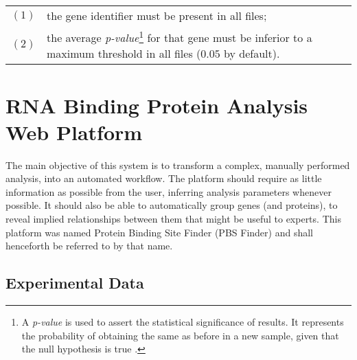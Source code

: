 \begin{savenotes}
\begin{table}[H]
  \begin{tabular}{l p{}}
    $(1)$ & the gene identifier must be present in all files;\\
    $(2)$ & the average \emph{p-value}\footnote{A \emph{p-value} is used to
    assert the statistical significance of results. It represents the
    probability of obtaining the same as before in a new sample, given that the
    null hypothesis is true \cite{goodman45dirty}.} for that gene must be
    inferior to a maximum threshold in all files ($0.05$ by default).\\
  \end{tabular}
\end{table}
\end{savenotes}

\section{RNA Binding Protein Analysis Web Platform}


The main objective of this system is to transform a complex, manually performed
analysis, into an automated workflow. The platform should require as little
information as possible from the user, inferring analysis parameters whenever
possible. It should also be able to automatically group genes (and proteins), to
reveal implied relationships between them that might be useful to experts. This
platform was named Protein Binding Site Finder (PBS Finder) and shall henceforth
be referred to by that name.

\subsection{Experimental Data}

